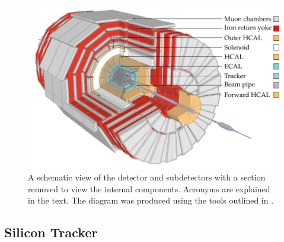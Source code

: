 \begin{figure}[htb]
    \centering
    \includegraphics[]{diagrams/tikz/cms/annotated/cms_full.pdf}
    \caption[Schematic view of the CMS detector.]{
        A schematic view of the \CMS detector and subdetectors with a section
        removed to view the internal components. Acronyms are explained in the
        text. The diagram was produced using the tools outlined in
        \cite{Sakuma:2013jqa}.
    }
    \label{fig:cms-full}
\end{figure}

\subsection{Silicon Tracker}

